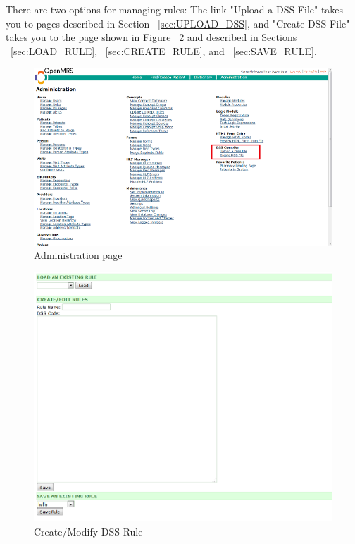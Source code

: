 \documentclass[12pt,letterpaper]{article}
\begin{document}
There are two options for managing rules: The link "Upload a DSS File" takes you to pages described in Section ~\ref{sec:UPLOAD_DSS}, and "Create DSS File" takes you to the 
page shown in Figure ~\ref{fig:CREATE_MODIFY} and described in 
Sections ~\ref{sec:LOAD_RULE}, ~\ref{sec:CREATE_RULE}, and 
~\ref{sec:SAVE_RULE}.

\begin{figure}[htbp]
\begin{center}
\includegraphics[width=6.5in]{user_guide/administration.png}
\end{center}
\caption{Administration page}
\label{fig:ADMINISTRATION_PAGE}
\end{figure}

\begin{figure}[htbp]
\begin{center}
\includegraphics[width=6.5in]{user_guide/create_modify.png}
\end{center}
\caption{Create/Modify DSS Rule}
\label{fig:CREATE_MODIFY}
\end{figure}
\end{document}
